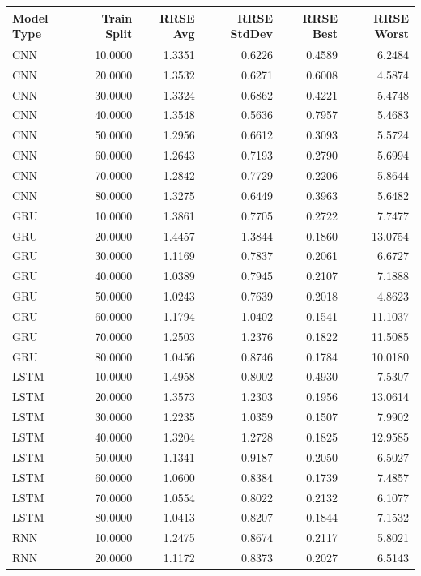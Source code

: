 \begin{tabular}{lrrrrr}
\toprule
Model Type & Train Split & RRSE Avg & RRSE StdDev & RRSE Best & RRSE Worst \\
\midrule
CNN & 10.0000 & 1.3351 & 0.6226 & 0.4589 & 6.2484 \\
CNN & 20.0000 & 1.3532 & 0.6271 & 0.6008 & 4.5874 \\
CNN & 30.0000 & 1.3324 & 0.6862 & 0.4221 & 5.4748 \\
CNN & 40.0000 & 1.3548 & 0.5636 & 0.7957 & 5.4683 \\
CNN & 50.0000 & 1.2956 & 0.6612 & 0.3093 & 5.5724 \\
CNN & 60.0000 & 1.2643 & 0.7193 & 0.2790 & 5.6994 \\
CNN & 70.0000 & 1.2842 & 0.7729 & 0.2206 & 5.8644 \\
CNN & 80.0000 & 1.3275 & 0.6449 & 0.3963 & 5.6482 \\
GRU & 10.0000 & 1.3861 & 0.7705 & 0.2722 & 7.7477 \\
GRU & 20.0000 & 1.4457 & 1.3844 & 0.1860 & 13.0754 \\
GRU & 30.0000 & 1.1169 & 0.7837 & 0.2061 & 6.6727 \\
GRU & 40.0000 & 1.0389 & 0.7945 & 0.2107 & 7.1888 \\
GRU & 50.0000 & 1.0243 & 0.7639 & 0.2018 & 4.8623 \\
GRU & 60.0000 & 1.1794 & 1.0402 & 0.1541 & 11.1037 \\
GRU & 70.0000 & 1.2503 & 1.2376 & 0.1822 & 11.5085 \\
GRU & 80.0000 & 1.0456 & 0.8746 & 0.1784 & 10.0180 \\
LSTM & 10.0000 & 1.4958 & 0.8002 & 0.4930 & 7.5307 \\
LSTM & 20.0000 & 1.3573 & 1.2303 & 0.1956 & 13.0614 \\
LSTM & 30.0000 & 1.2235 & 1.0359 & 0.1507 & 7.9902 \\
LSTM & 40.0000 & 1.3204 & 1.2728 & 0.1825 & 12.9585 \\
LSTM & 50.0000 & 1.1341 & 0.9187 & 0.2050 & 6.5027 \\
LSTM & 60.0000 & 1.0600 & 0.8384 & 0.1739 & 7.4857 \\
LSTM & 70.0000 & 1.0554 & 0.8022 & 0.2132 & 6.1077 \\
LSTM & 80.0000 & 1.0413 & 0.8207 & 0.1844 & 7.1532 \\
RNN & 10.0000 & 1.2475 & 0.8674 & 0.2117 & 5.8021 \\
RNN & 20.0000 & 1.1172 & 0.8373 & 0.2027 & 6.5143 \\

\end{tabular}
